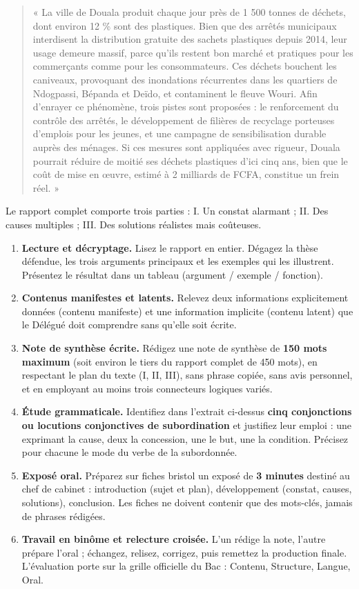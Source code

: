 \documentclass[11pt]{article}
\newcounter{popsec}
\newcounter{popsub}
\newcommand{\courssub}[1]{%
  \stepcounter{popsub}%
  \par\vspace{9pt}\noindent{\popxbold\fontsize{11.5}{13}\selectfont\color{popink}{\color{poporange}\thepopsec.\thepopsub}\hspace{6pt}#1}\par\nopagebreak\vspace{4pt}
}
\begin{document}
\begin{quote}
« La ville de Douala produit chaque jour près de 1 500 tonnes de déchets, dont environ 12 \% sont des plastiques. Bien que des arrêtés municipaux interdisent la distribution gratuite des sachets plastiques depuis 2014, leur usage demeure massif, parce qu'ils restent bon marché et pratiques pour les commerçants comme pour les consommateurs. Ces déchets bouchent les caniveaux, provoquant des inondations récurrentes dans les quartiers de Ndogpassi, Bépanda et Deïdo, et contaminent le fleuve Wouri. Afin d'enrayer ce phénomène, trois pistes sont proposées : le renforcement du contrôle des arrêtés, le développement de filières de recyclage porteuses d'emplois pour les jeunes, et une campagne de sensibilisation durable auprès des ménages. Si ces mesures sont appliquées avec rigueur, Douala pourrait réduire de moitié ses déchets plastiques d'ici cinq ans, bien que le coût de mise en œuvre, estimé à 2 milliards de FCFA, constitue un frein réel. »
\end{quote}

Le rapport complet comporte trois parties : I. Un constat alarmant ; II. Des causes multiples ; III. Des solutions réalistes mais coûteuses.

\courssub{Consignes}

\begin{enumerate}
\item \textbf{Lecture et décryptage.} Lisez le rapport en entier. Dégagez la thèse défendue, les trois arguments principaux et les exemples qui les illustrent. Présentez le résultat dans un tableau (argument / exemple / fonction).
\item \textbf{Contenus manifestes et latents.} Relevez deux informations explicitement données (contenu manifeste) et une information implicite (contenu latent) que le Délégué doit comprendre sans qu'elle soit écrite.
\item \textbf{Note de synthèse écrite.} Rédigez une note de synthèse de \textbf{150 mots maximum} (soit environ le tiers du rapport complet de 450 mots), en respectant le plan du texte (I, II, III), sans phrase copiée, sans avis personnel, et en employant au moins trois connecteurs logiques variés.
\item \textbf{Étude grammaticale.} Identifiez dans l'extrait ci-dessus \textbf{cinq conjonctions ou locutions conjonctives de subordination} et justifiez leur emploi : une exprimant la cause, deux la concession, une le but, une la condition. Précisez pour chacune le mode du verbe de la subordonnée.
\item \textbf{Exposé oral.} Préparez sur fiches bristol un exposé de \textbf{3 minutes} destiné au chef de cabinet : introduction (sujet et plan), développement (constat, causes, solutions), conclusion. Les fiches ne doivent contenir que des mots-clés, jamais de phrases rédigées.
\item \textbf{Travail en binôme et relecture croisée.} L'un rédige la note, l'autre prépare l'oral ; échangez, relisez, corrigez, puis remettez la production finale. L'évaluation porte sur la grille officielle du Bac : Contenu, Structure, Langue, Oral.
\end{enumerate}
\end{document}
